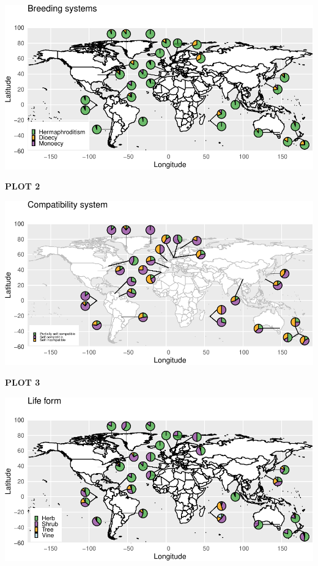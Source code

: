 \documentclass[12pt,]{article}
\begin{document}
\newpage

\vspace{4cm}

\includegraphics{Draft_files/figure-latex/unnamed-chunk-3-1.pdf}

\newpage

\textbf{PLOT 2}

\begin{center}\includegraphics{Draft_files/figure-latex/unnamed-chunk-4-1} \end{center}

\newpage

\textbf{PLOT 3}

\begin{center}\includegraphics{Draft_files/figure-latex/unnamed-chunk-5-1} \end{center}
\end{document}
